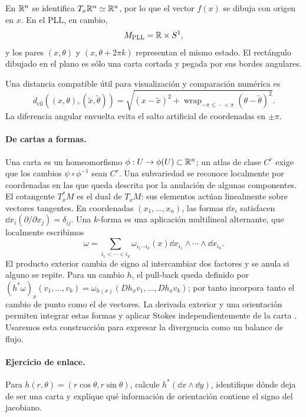 En \(\mathbb{R}^n\) se identifica \(T_x\mathbb{R}^n\simeq\mathbb{R}^n\), por lo que el vector
\(f(x)\) se dibuja con origen en \(x\). En el PLL, en cambio,
\begin{equation}
  M_{\mathrm{PLL}}=\mathbb{R}\times S^1,
  \label{geo:eq:pll-phase-space}
\end{equation}
y los pares \((x,\theta)\) y \((x,\theta+2\pi k)\) representan el mismo estado.
El rectángulo dibujado en el plano es sólo una carta cortada y pegada por sus
bordes angulares.

Una distancia compatible útil para visualización y comparación numérica es
\begin{equation}
 d_{\mathrm{cil}}((x,\theta),(\tilde x,\tilde\theta))
 =\sqrt{(x-\tilde x)^2+
 \operatorname{wrap}_{-\pi\le\,\cdot\,<\pi}(\theta-\tilde\theta)^2}.
 \label{geo:eq:cylindrical-distance}
\end{equation}
La diferencia angular envuelta evita el salto artificial de coordenadas en
\(\pm\pi\).

\paragraph{De cartas a formas.}
Una carta es un homeomorfismo \(\phi:U\to\phi(U)\subset\mathbb{R}^n\); un atlas de
clase \(C^r\) exige que los cambios \(\psi\circ\phi^{-1}\) sean \(C^r\). Una
subvariedad se reconoce localmente por coordenadas en las que queda descrita
por la anulación de algunas componentes. El cotangente \(T_x^*M\) es el dual
de \(T_xM\): sus elementos actúan linealmente sobre vectores tangentes.
En coordenadas \((x_1,\ldots,x_n)\), las formas \(\dd x_i\) satisfacen
\(\dd x_i(\partial/\partial x_j)=\delta_{ij}\). Una \(k\)-forma es una
aplicación multilineal alternante, que localmente escribimos
\[
 \omega=\sum_{i_1<\cdots<i_k}\omega_{i_1\cdots i_k}(x)
 \dd x_{i_1}\wedge\cdots\wedge\dd x_{i_k}.
\]
El producto exterior cambia de signo al intercambiar dos factores y se anula
si alguno se repite. Para un cambio \(h\), el pull-back queda definido por
\((h^*\omega)_x(v_1,\ldots,v_k)=
\omega_{h(x)}(Dh_xv_1,\ldots,Dh_xv_k)\); por tanto incorpora tanto el
cambio de punto como el de vectores. La derivada exterior y una orientación
permiten integrar estas formas y aplicar Stokes independientemente de la
carta \cite{NahmadAchar2022Topologia}. Usaremos esta construcción para
expresar la divergencia como un balance de flujo.

\ifHAFOPedagogy
\paragraph{Ejercicio de enlace.}
Para \(h(r,\theta)=(r\cos\theta,r\sin\theta)\), calcule
\(h^*(\dd x\wedge\dd y)\), identifique dónde deja de ser una carta y explique
qué información de orientación contiene el signo del jacobiano.
\fi

